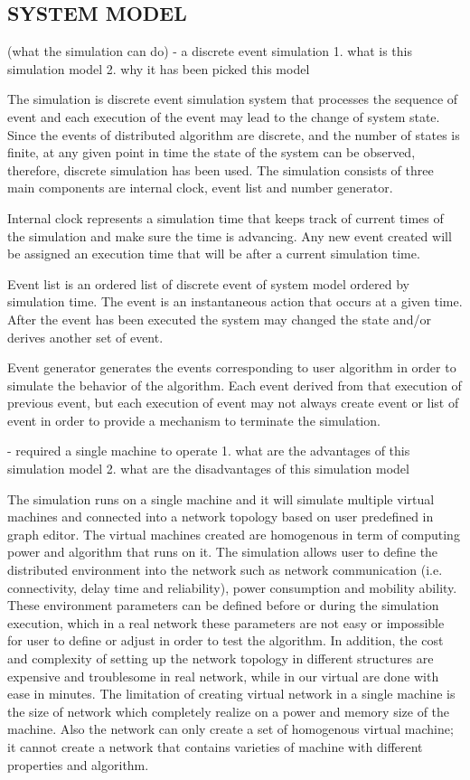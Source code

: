 \subsection{SYSTEM MODEL}
(what the simulation can do)
- a discrete event simulation
1. what is this simulation model
2. why it has been picked this model

The simulation is discrete event simulation system that processes the sequence of event and each execution of the event may lead to the change of system state. Since the events of distributed algorithm are discrete, and the number of states is finite, at any given point in time the state of the system can be observed, therefore, discrete simulation has been used. The simulation consists of three main components are internal clock, event list and number generator.

Internal clock represents a simulation time that keeps track of current times of the simulation and make sure the time is advancing. Any new event created will be assigned an execution time that will be after a current simulation time.

Event list is an ordered list of discrete event of system model ordered by simulation time. The event is an instantaneous action that occurs at a given time. After the event has been executed the system may changed the state and/or derives another set of event.

Event generator generates the events corresponding to user algorithm in order to simulate the behavior of the algorithm. Each event derived from that execution of previous event, but each execution of event may not always create event or list of event in order to provide a mechanism to terminate the simulation.


- required a single machine to operate
1. what are the advantages of this simulation model
2. what are the disadvantages of this simulation model

The simulation runs on a single machine and it will simulate multiple virtual machines and connected into a network topology based on user predefined in graph editor. The virtual machines created are homogenous in term of computing power and algorithm that runs on it. The simulation allows user to define the distributed environment into the network such as network communication (i.e. connectivity, delay time and reliability), power consumption and mobility ability. These environment parameters can be defined before or during the simulation execution, which in a real network these parameters are not easy or impossible for user to define or adjust in order to test the algorithm. In addition, the cost and complexity of setting up the network topology in different structures are expensive and troublesome in real network, while in our virtual are done with ease in minutes.
The limitation of creating virtual network in a single machine is the size of network which completely realize on a power and memory size of the machine. Also the network can only create a set of homogenous virtual machine; it cannot create a network that contains varieties of machine with different properties and algorithm.


